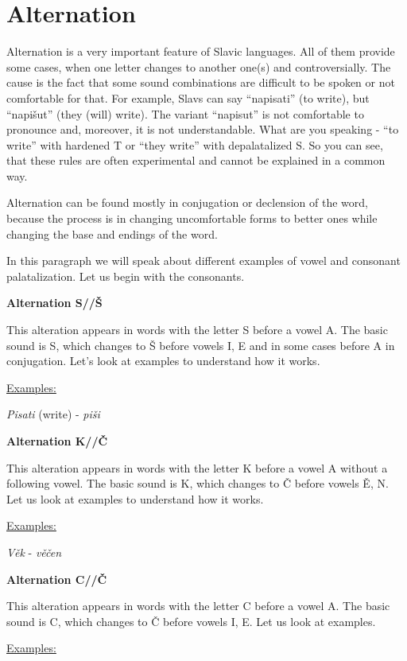 \section{Alternation}

Alternation is a very important feature of Slavic languages. All of them provide some cases, when one letter changes to another one(s) and controversially. The cause is the fact that some sound combinations are difficult to be spoken or not comfortable for that. For example, Slavs can say “napisati” (to write), but “napišut” (they (will) write). The variant “napisut” is not comfortable to pronounce and, moreover, it is not understandable. What are you speaking - “to write” with hardened T or “they write” with depalatalized S. So you can see, that these rules are often experimental and cannot be explained in a common way.

Alternation can be found mostly in conjugation or declension of the word, because the process is in changing uncomfortable forms to better ones while changing the base and endings of the word. 

In this paragraph we will speak about different examples of vowel and consonant palatalization. Let us begin with the consonants.

\textbf{Alternation S//Š}

This alteration appears in words with the letter S before a vowel A. The basic sound is S, which changes to Š before vowels I, E and in some cases before A in conjugation. Let’s look at examples to understand how it works.

\underline{Examples:}

\textit{Pisati} (write) \textipa{[’pisat1]} - \textit{piši} \textipa{[pi’\:s1]}

\textbf{Alternation K//Č}

This alteration appears in words with the letter K before a vowel A without a following vowel. The basic sound is K, which changes to Č before vowels Ě, N. Let us look at examples to understand how it works.

\underline{Examples:}

\textit{Věk} \textipa{[vIk]} - \textit{věčen} \textipa{['vI\t{tS}en]}

\textbf{Alternation C//Č}

This alteration appears in words with the letter C before a vowel A. The basic sound is C, which changes to Č before vowels I, E. Let us look at examples.

\underline{Examples:}

